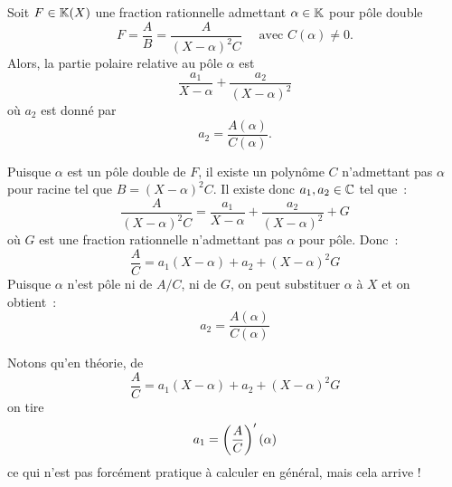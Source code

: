\documentclass{magnolia}
\begin{document}

\begin{proposition}
Soit $F\in\fracK$ une fraction rationnelle admettant $\alpha\in\mathbb{K}$ pour pôle double
\[F=\frac{A}{B}=\frac{A}{(X-\alpha)^2C} \quad \text{ avec } C(\alpha)\neq 0. \]
Alors, la partie polaire relative au pôle $\alpha$ est
\[\frac{a_1}{X-\alpha}+\frac{a_2}{(X-\alpha)^2}\]
où $a_2$ est donné par 
\[a_2=\frac{A(\alpha)}{C(\alpha)}.\]
\end{proposition}

\begin{preuve}
Puisque $\alpha$ est un pôle double de $F$, il existe un polynôme $C$
 n'admettant pas $\alpha$ pour racine tel que $B=(X-\alpha)^2 C$.
 Il existe donc $a_1,a_2\in\mathbb{C}$ tel que~:
 $$\frac{A}{(X-\alpha)^2C}=\frac{a_1}{X-\alpha}+\frac{a_2}{(X-\alpha)^2}+G$$
 où $G$ est une fraction rationnelle n'admettant pas $\alpha$ pour pôle. Donc~:
 $$\frac{A}{C}=a_1(X-\alpha)+a_2+(X-\alpha)^2 G$$
 Puisque $\alpha$ n'est pôle ni de $A/C$, ni de $G$, on peut substituer $\alpha$
 à $X$ et on obtient~:
 $$a_2=\frac{A(\alpha)}{C(\alpha)}$$
 \end{preuve}
 
 \begin{sol}
 Notons qu'en théorie, de $$\frac{A}{C}=a_1(X-\alpha)+a_2+(X-\alpha)^2 G$$ on tire $$a_1=\left(\frac{A}{C}\right)'(\alpha)$$ ce qui n'est pas forcément pratique à calculer en général, mais cela arrive !
 \end{sol}
\end{document}
